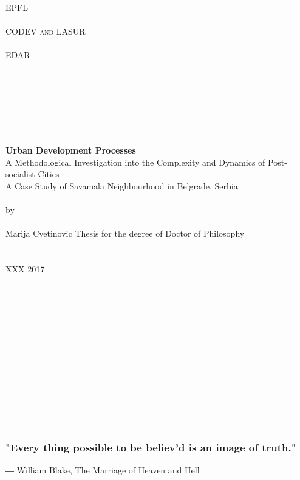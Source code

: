 \documentclass[11pt]{report}
\begin{document}
\begin{titlepage}
\begin{center}
\large
\textsc{EPFL} \\
\ \\
\textsc{CODEV and LASUR} \\
\ \\
\textsc{EDAR}\\
\ \\
\ \\
\ \\
\ \\
\ \\
\ \\
\ \\
\huge
\textbf{Urban Development Processes} 
\ \\
\huge
{A Methodological Investigation into the Complexity and Dynamics of Post-socialist Cities}
\ \\
\Large
{A Case Study of Savamala Neighbourhood in Belgrade, Serbia}
\ \\
\ \\
\large by
\ \\
\ \\
Marija Cvetinovic
\vfill
Thesis for the degree of Doctor of Philosophy \\
\ \\
\ \\
XXX 2017
\end{center}
\end{titlepage}
\begin{titlepage}
\begin{center}
\ \\
\ \\
\ \\
\ \\
\ \\
\ \\
\ \\
\ \\
\ \\
\ \\
\ \\
\ \\
\subsubsection{"Every thing possible to be believ'd is an image of truth."}

\end{center}

\begin{flushright}
― William Blake, The Marriage of Heaven and Hell
\end{flushright}

\end{titlepage}
\end{document}
